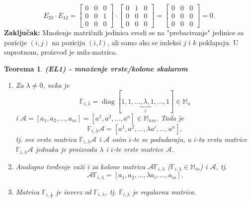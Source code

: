 \documentclass[a4paper,12pt,twoside]{report}
\newtheorem{theorem}{Teorema}[section]
\numberwithin{algorithm}{section}
\begin{document}
\[
E_{23} \cdot E_{12} =
\begin{bmatrix}
0 & 0 & 0 \\
0 & 0 & 1 \\
0 & 0 & 0
\end{bmatrix}
\cdot
\begin{bmatrix}
0 & 1 & 0 \\
0 & 0 & 0 \\
0 & 0 & 0
\end{bmatrix}
=
\begin{bmatrix}
0 & 0 & 0 \\
0 & 0 & 0 \\
0 & 0 & 0
\end{bmatrix}
= 0.
\]
\vfill
\medskip
\noindent
\textbf{Zaključak:} Množenje matričnih jedinica svodi se na "prebacivanje" jedinice sa pozicije $(i,j)$ na poziciju $(i,l)$, ali samo ako se indeksi $j$ i $k$ poklapaju. U suprotnom, proizvod je nula-matrica.
\vfill
\newpage
\begin{theorem} \textbf{(EL1) - množenje vrste/kolone skalarom} \label{rangMatriceTeorema1}
    \begin{enumerate}
        \item Za $\lambda \neq 0$, neka je \[\mathbb{F}_{i,\lambda} = \operatorname{diag}[1, 1, \ldots \underbrace{,\lambda,}_i 1, \ldots, 1] \in \mathbb{M}_n\] i $\mathcal{A} = [a_1, a_2, \ldots, a_m] = [a^1, a^2, \ldots, a^n] \in \mathbb{M}_{nm}$. Tada je \[\mathbb{F}_{i,\lambda} \mathcal{A} = [a^1, a^2, \ldots, \lambda a^i, \ldots, a^n],\] tj. sve vrste matrica $\mathbb{F}_{i,\lambda} \mathcal{A}$ i $\mathcal{A}$ osim $i$-te se podudaraju, a $i$-ta vrsta matrice $\mathbb{F}_{i,\lambda} \mathcal{A}$ jednaka je proizvodu $\lambda$ i $i$-te vrste matrice $\mathcal{A}$.

        \item Analogno tvrđenje važi i za kolone matrica $\mathcal{A} \mathbb{F}_{i,\lambda}$ ($\mathbb{F}_{i,\lambda} \in \mathbb{M}_{m}$) i $\mathcal{A}$, tj. \[\mathcal{A} \mathbb{F}_{i,\lambda} = [a_1, a_2, \ldots, \lambda a_i, \ldots, a_m].\]

        \item Matrica $\mathbb{F}_{i,\frac{1}{\lambda}}$ je inverz od $\mathbb{F}_{i,\lambda}$, tj. $\mathbb{F}_{i,\lambda}$ je regularna matrica.

    \end{enumerate}
    \label{rangMatriceTeorema2}
\end{theorem}
\end{document}
